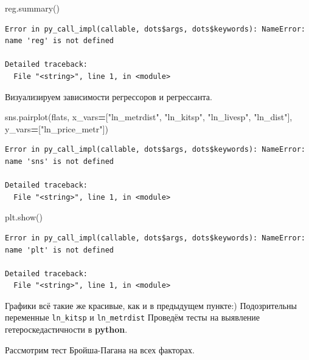 \documentclass[]{book}
\newenvironment{Shaded}{\begin{snugshade}}{\end{snugshade}}
\newcommand{\NormalTok}[1]{#1}
\newcommand{\OperatorTok}[1]{\textcolor[rgb]{0.81,0.36,0.00}{\textbf{#1}}}
\newcommand{\StringTok}[1]{\textcolor[rgb]{0.31,0.60,0.02}{#1}}
\begin{document}
\begin{Shaded}
\begin{Highlighting}[]
\NormalTok{reg.summary()}
\end{Highlighting}
\end{Shaded}

\begin{verbatim}
Error in py_call_impl(callable, dots$args, dots$keywords): NameError: name 'reg' is not defined

Detailed traceback: 
  File "<string>", line 1, in <module>
\end{verbatim}

Визуализируем зависимости регрессоров и регрессанта.

\begin{Shaded}
\begin{Highlighting}[]
\NormalTok{sns.pairplot(flats, x_vars}\OperatorTok{=}\NormalTok{[}\StringTok{"ln_metrdist"}\NormalTok{, }\StringTok{"ln_kitsp"}\NormalTok{, }\StringTok{"ln_livesp"}\NormalTok{, }\StringTok{"ln_dist"}\NormalTok{], y_vars}\OperatorTok{=}\NormalTok{[}\StringTok{"ln_price_metr"}\NormalTok{])}
\end{Highlighting}
\end{Shaded}

\begin{verbatim}
Error in py_call_impl(callable, dots$args, dots$keywords): NameError: name 'sns' is not defined

Detailed traceback: 
  File "<string>", line 1, in <module>
\end{verbatim}

\begin{Shaded}
\begin{Highlighting}[]
\NormalTok{plt.show()}
\end{Highlighting}
\end{Shaded}

\begin{verbatim}
Error in py_call_impl(callable, dots$args, dots$keywords): NameError: name 'plt' is not defined

Detailed traceback: 
  File "<string>", line 1, in <module>
\end{verbatim}

Графики всё такие же красивые, как и в предыдущем пункте:) Подозрительны переменные \texttt{ln\_kitsp} и \texttt{ln\_metrdist}
Проведём тесты на выявление гетероскедастичности в \textbf{python}.

Рассмотрим тест Бройша-Пагана на всех факторах.
\end{document}
